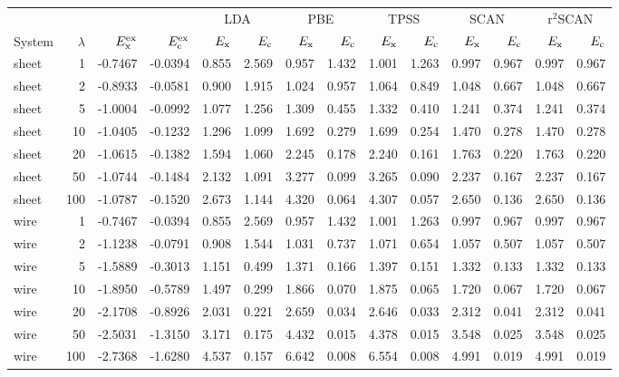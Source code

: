 \begin{tabular}{lrrrrrrrrrrrrr}
\toprule
& & & & \multicolumn{2}{c}{LDA} & \multicolumn{2}{c}{PBE} & \multicolumn{2}{c}{TPSS} & \multicolumn{2}{c}{SCAN} & \multicolumn{2}{c}{r$^2$SCAN} \\
System & $\lambda$ & $E_{\rm x}^{\rm ex}$ & $E_{\rm c}^{\rm ex}$ & $E_{\rm x}$ & $E_{\rm c}$ & $E_{\rm x}$ & $E_{\rm c}$ & $E_{\rm x}$ & $E_{\rm c}$ & $E_{\rm x}$ & $E_{\rm c}$ & $E_{\rm x}$ & $E_{\rm c}$ \\
\midrule
sheet & 1 & -0.7467 & -0.0394 & 0.855 & 2.569 & 0.957 & 1.432 & 1.001 & 1.263 & 0.997 & 0.967 & 0.997 & 0.967 \\
sheet & 2 & -0.8933 & -0.0581 & 0.900 & 1.915 & 1.024 & 0.957 & 1.064 & 0.849 & 1.048 & 0.667 & 1.048 & 0.667 \\
sheet & 5 & -1.0004 & -0.0992 & 1.077 & 1.256 & 1.309 & 0.455 & 1.332 & 0.410 & 1.241 & 0.374 & 1.241 & 0.374 \\
sheet & 10 & -1.0405 & -0.1232 & 1.296 & 1.099 & 1.692 & 0.279 & 1.699 & 0.254 & 1.470 & 0.278 & 1.470 & 0.278 \\
sheet & 20 & -1.0615 & -0.1382 & 1.594 & 1.060 & 2.245 & 0.178 & 2.240 & 0.161 & 1.763 & 0.220 & 1.763 & 0.220 \\
sheet & 50 & -1.0744 & -0.1484 & 2.132 & 1.091 & 3.277 & 0.099 & 3.265 & 0.090 & 2.237 & 0.167 & 2.237 & 0.167 \\
sheet & 100 & -1.0787 & -0.1520 & 2.673 & 1.144 & 4.320 & 0.064 & 4.307 & 0.057 & 2.650 & 0.136 & 2.650 & 0.136 \\
\midrule
wire & 1 & -0.7467 & -0.0394 & 0.855 & 2.569 & 0.957 & 1.432 & 1.001 & 1.263 & 0.997 & 0.967 & 0.997 & 0.967 \\
wire & 2 & -1.1238 & -0.0791 & 0.908 & 1.544 & 1.031 & 0.737 & 1.071 & 0.654 & 1.057 & 0.507 & 1.057 & 0.507 \\
wire & 5 & -1.5889 & -0.3013 & 1.151 & 0.499 & 1.371 & 0.166 & 1.397 & 0.151 & 1.332 & 0.133 & 1.332 & 0.133 \\
wire & 10 & -1.8950 & -0.5789 & 1.497 & 0.299 & 1.866 & 0.070 & 1.875 & 0.065 & 1.720 & 0.067 & 1.720 & 0.067 \\
wire & 20 & -2.1708 & -0.8926 & 2.031 & 0.221 & 2.659 & 0.034 & 2.646 & 0.033 & 2.312 & 0.041 & 2.312 & 0.041 \\
wire & 50 & -2.5031 & -1.3150 & 3.171 & 0.175 & 4.432 & 0.015 & 4.378 & 0.015 & 3.548 & 0.025 & 3.548 & 0.025 \\
wire & 100 & -2.7368 & -1.6280 & 4.537 & 0.157 & 6.642 & 0.008 & 6.554 & 0.008 & 4.991 & 0.019 & 4.991 & 0.019 \\
\bottomrule
\end{tabular}
